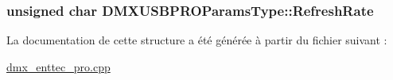 \hypertarget{struct_d_m_x_u_s_b_p_r_o_params_type_a6258e9923d9bc0725d4b2cc0be515d70}{
\subsubsection[{Refresh\+Rate}]{\setlength{\rightskip}{0pt plus 5cm}unsigned char D\+M\+X\+U\+S\+B\+P\+R\+O\+Params\+Type\+::\+Refresh\+Rate}}\label{struct_d_m_x_u_s_b_p_r_o_params_type_a6258e9923d9bc0725d4b2cc0be515d70}


La documentation de cette structure a été générée à partir du fichier suivant \+:\begin{DoxyCompactItemize}
\item 
\hyperlink{dmx__enttec__pro_8cpp}{dmx\+\_\+enttec\+\_\+pro.\+cpp}\end{DoxyCompactItemize}
